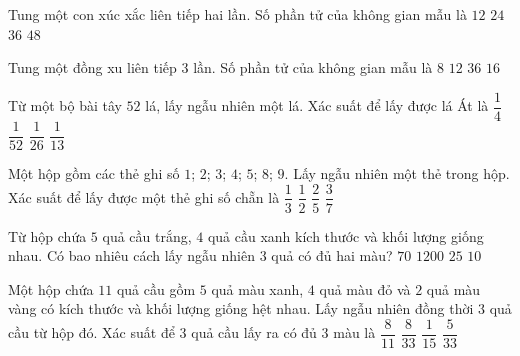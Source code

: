 \begin{ex}%
Tung một con xúc xắc liên tiếp hai lần. Số phần tử của không gian mẫu là
\choice
{$12$}
{$24$}
{\True $36$}
{$48$}
\end{ex}
\begin{ex}%
Tung một đồng xu liên tiếp $3$ lần. Số phần tử của không gian mẫu là
\choice
{\True $8$}
{$12$}
{$36$}
{$16$}
\end{ex}
\begin{ex}%
Từ một bộ bài tây $52$ lá, lấy ngẫu nhiên một lá. Xác suất để lấy được lá Át là
\choice
{$\dfrac{1}{4}$}
{$\dfrac{1}{52}$}
{$\dfrac{1}{26}$}
{\True $\dfrac{1}{13}$}
\end{ex}
\begin{ex}%
Một hộp gồm các thẻ ghi số $1 $; $2 $; $3 $; $4 $; $5 $; $8 $; $9$. Lấy ngẫu nhiên một thẻ trong hộp. Xác suất để lấy được một thẻ ghi số chẵn là
\choice
{$\dfrac{1}{3}$}
{$\dfrac{1}{2}$}
{$\dfrac{2}{5}$}
{\True $\dfrac{3}{7}$}
\end{ex}
\begin{ex}%
Từ hộp chứa $5$ quả cầu trắng, $4$ quả cầu xanh kích thước và khối lượng giống nhau. Có bao nhiêu cách lấy ngẫu nhiên $3$ quả có đủ hai màu?
\choice
{\True $70$}
{$1200$}
{$25$}
{$10$}
\end{ex}
\begin{ex}%
Một hộp chứa $11$ quả cầu gồm $5$ quả màu xanh, $4$ quả màu đỏ và $2$ quả màu vàng có kích thước và khối lượng giống hệt nhau. Lấy ngẫu nhiên đồng thời $3$ quả cầu từ hộp đó. Xác suất để $3$ quả cầu lấy ra có đủ $3$ màu là
\choice
{$\dfrac{8}{11}$}
{\True $\dfrac{8}{33}$}
{$\dfrac{1}{15}$}
{$\dfrac{5}{33}$}
\end{ex}
